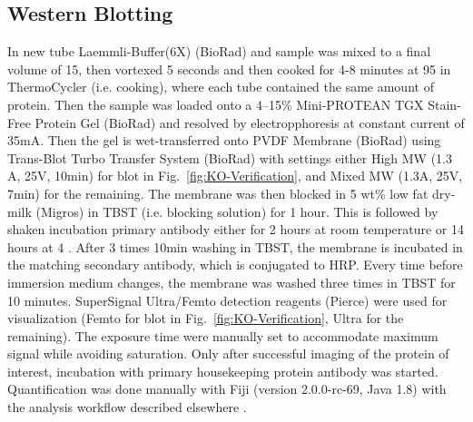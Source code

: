 \subsection{Western Blotting}
In new tube Laemmli-Buffer(6X) (BioRad) and sample was mixed to a final volume of 15\mul{}, then  vortexed 5 seconds and then cooked for 4-8 minutes at 95 \degC in ThermoCycler (i.e. cooking), where each tube contained the same amount of protein. Then the sample was loaded onto a 4–15\% Mini-PROTEAN TGX Stain-Free Protein Gel (BioRad) and resolved by electropphoresis at constant current of 35mA. Then the gel is wet-transferred onto PVDF Membrane (BioRad) using Trans-Blot Turbo Transfer System (BioRad) with settings either High MW (1.3 A, 25V, 10min) for blot in Fig.~\vref{fig:KO-Verification}, and Mixed MW (1.3A, 25V, 7min) for the remaining. The membrane was then blocked in 5 wt\% low fat dry-milk (Migros) in TBST (i.e. blocking solution) for 1 hour. This is followed by shaken incubation primary antibody either for 2 hours at room temperature or 14 hours at 4 \degC{}. After 3 times 10min washing in TBST, the membrane is incubated in the matching secondary antibody, which is conjugated to HRP. Every time before immersion medium changes, the membrane was washed three times in TBST for 10 minutes. SuperSignal Ultra/Femto detection reagents (Pierce) were used for visualization (Femto for blot in Fig.~\vref{fig:KO-Verification}, Ultra for the remaining). The exposure time were manually set to accommodate maximum signal while avoiding saturation. Only after successful imaging of the protein of interest, incubation with primary housekeeping protein antibody was started. Quantification was done manually with Fiji (version 2.0.0-rc-69, Java 1.8) with the analysis workflow described elsewhere \cite{Miller2010}.



